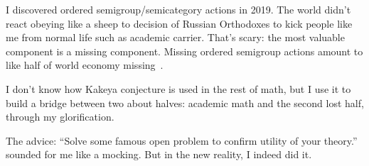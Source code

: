 \documentclass[oneside,draft]{amsart}
\begin{document}
I discovered ordered semigroup/semicategory actions in 2019. The world didn't react obeying like a sheep to decision of Russian Orthodoxes to kick people like me from normal life such as academic carrier. That's scary: the most valuable component is a missing component. Missing ordered semigroup actions amount to like half of world economy missing~\cite{osa-important}.

I don't know how Kakeya conjecture is used in the rest of math, but I use it to build a bridge between two about halves: academic math and the second lost half, through my glorification.

The advice: ``Solve some famous open problem to confirm utility of your theory.'' sounded for me like a mocking. But in the new reality, I indeed did it.



\end{document}
